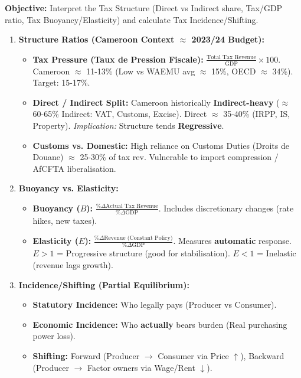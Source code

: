 \documentclass[11pt]{article}
\begin{document}
\begin{methode}
\textbf{Objective:} Interpret the Tax Structure (Direct vs Indirect share, Tax/GDP ratio, Tax Buoyancy/Elasticity) and calculate Tax Incidence/Shifting.
\begin{enumerate}
    \item \textbf{Structure Ratios (Cameroon Context $\approx$ 2023/24 Budget):}
    \begin{itemize}
        \item \textbf{Tax Pressure (Taux de Pression Fiscale):} $\frac{\text{Total Tax Revenue}}{\text{GDP}} \times 100$. Cameroon $\approx$ 11-13\% (Low vs WAEMU avg $\approx$ 15\%, OECD $\approx$ 34\%). Target: 15-17\%.
        \item \textbf{Direct / Indirect Split:} Cameroon historically \textbf{Indirect-heavy} ($\approx$ 60-65\% Indirect: VAT, Customs, Excise). Direct $\approx$ 35-40\% (IRPP, IS, Property). \textit{Implication:} Structure tends \textbf{Regressive}.
        \item \textbf{Customs vs. Domestic:} High reliance on Customs Duties (Droits de Douane) $\approx$ 25-30\% of tax rev. Vulnerable to import compression / AfCFTA liberalisation.
    \end{itemize}
    \item \textbf{Buoyancy vs. Elasticity:}
    \begin{itemize}
        \item \textbf{Buoyancy ($B$):} $\frac{\% \Delta \text{Actual Tax Revenue}}{\% \Delta \text{GDP}}$. Includes discretionary changes (rate hikes, new taxes).
        \item \textbf{Elasticity ($E$):} $\frac{\% \Delta \text{Revenue (Constant Policy)}}{\% \Delta \text{GDP}}$. Measures \textbf{automatic} response. $E > 1$ = Progressive structure (good for stabilisation). $E < 1$ = Inelastic (revenue lags growth).
    \end{itemize}
    \item \textbf{Incidence/Shifting (Partial Equilibrium):}
    \begin{itemize}
        \item \textbf{Statutory Incidence:} Who legally pays (Producer vs Consumer).
        \item \textbf{Economic Incidence:} Who \textbf{actually} bears burden (Real purchasing power loss).
        \item \textbf{Shifting:} Forward (Producer $\rightarrow$ Consumer via Price $\uparrow$), Backward (Producer $\rightarrow$ Factor owners via Wage/Rent $\downarrow$).

\end{itemize}
\end{enumerate}
\end{methode}
\end{document}

